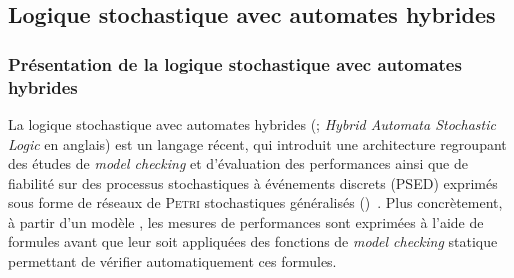     \subsection{Logique stochastique avec automates hybrides}

        \subsubsection{Présentation de la logique stochastique avec automates hybrides}
La logique stochastique avec automates hybrides (\lsah; \textit{Hybrid Automata Stochastic Logic} en anglais) est un langage récent, qui introduit une architecture regroupant des études de \textit{model checking} et d'évaluation des performances ainsi que de fiabilité sur des processus stochastiques à événements discrets (PSED) exprimés sous forme de réseaux de \textsc{Petri} stochastiques généralisés (\rpsg)~\cite{BDDHP11hasl}.
Plus concrètement, à partir d'un modèle \rpsg, les mesures de performances sont exprimées à l'aide de formules \lsah avant que leur soit appliquées des fonctions de \textit{model checking} statique permettant de vérifier automatiquement ces formules.


